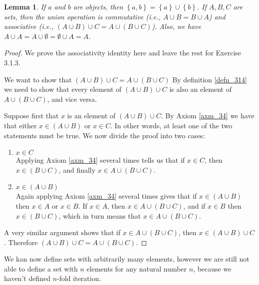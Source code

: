 \documentclass[a4paper, twocolumn]{report}
\newcounter{dummy} \numberwithin{dummy}{section}
\newtheorem{lma}[dummy]{Lemma}
\theoremstyle{definition}
\theoremstyle{solution}
\newcommand{\union}{\cup}
\begin{document}
\begin{lma}
  \label{lma_3113} 
  If $a$ and $b$ are objects, then $\left\{ a, b \right\} = \left\{ a \right\}
  \union \left\{ b \right\}$. If $A, B, C$ are sets, then the union operation
  is commutative (i.e., $A \union B = B \union A$) and associative (i.e.,
  $\left( A\union B \right)\union C = A\union(B\union C)$). Also, we have $A
  \union A = A \union \emptyset = \emptyset \union A = A$. 
\end{lma}

\begin{proof}
  We prove the associativity identity here and leave the rest for Exercise 3.1.3.

  We want to show that $\left( A\union B \right)\union C = A\union(B\union C)$
  By definition \ref{defn_314} we need to show that every element of $\left(
  A\union B \right)\union C$ is also an element of $A\union(B\union C)$, and
  vice versa.

  Suppose first that $x$ is an element of $(A \union B) \union C$. By Axiom
  \ref{axm_34} we have that either $x \in (A \union B)$ or $x \in C$. In other words, at
  least one of the two statements must be true.
  We now divide the proof into two cases:
  
  \begin{enumerate}
    \item $ x \in C$ \\
      [0.2cm]
      Applying Axiom \ref{axm_34} several times tells us that if $x \in C$,
      then $x \in (B \union C)$, and finally $x \in A \union (B \union C)$.

    \item $ x \in (A \union B)$ \\
      [0.2cm]
      Again applying Axiom \ref{axm_34} several times gives that if $x \in (A
      \union B)$ then $x \in A$ or $x \in B$.  If $x \in A$, then $x \in
      A\union(B\union C)$, and if $x \in B$ then $x \in (B \union C)$, which in
      turn means that $x \in A \union (B \union C)$. 
  \end{enumerate}

  A very similar argument shows that if $x \in A \union (B \union C)$, then $ x
  \in (A\union B) \union C$.  Therefore $\left( A\union B \right)\union C = A\union(B\union C)$.
\end{proof}
\addtocounter{dummy}{1}

We kan now define sets with arbitrarily many elements, however we are still not
able to define a set with $n$ elements for any natural number $n$, because we
haven't defined $n$-fold iteration.
\end{document}
